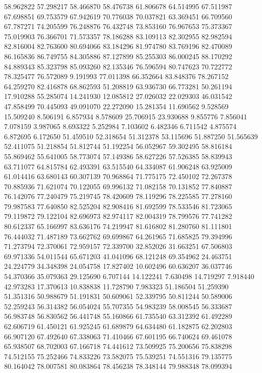 58.962822
57.298217
58.466870
58.476738
61.806678
64.514995
67.511987
67.698851
69.753579
67.942619
70.776038
70.037821
63.369451
66.709560
67.787271
74.205599
76.248876
76.432748
73.853160
76.967653
75.373367
75.019903
76.366701
71.573357
78.186288
83.109113
82.302955
82.982594
82.816004
82.763600
80.694066
83.184296
81.974780
83.769196
82.470089
86.165836
86.749755
84.305886
87.127899
85.255303
86.000245
88.170292
84.889343
85.323798
85.093260
82.135346
76.596594
80.747623
70.722772
78.325477
76.572089
9.191993
77.011398
66.352664
83.848376
78.267152
64.259270
82.416878
68.862593
51.208819
63.936730
66.773281
50.261194
17.910288
55.285074
14.241930
12.085812
27.026032
22.029303
46.031542
47.858499
70.445093
49.091070
22.272090
15.281354
11.690562
9.528569
15.509240
8.506191
6.857934
8.578609
25.706915
23.930688
9.855776
7.856041
7.078159
3.987065
8.693322
5.252984
7.103602
6.482346
6.711542
4.875574
6.872695
6.172650
51.459510
52.318654
51.312378
53.115696
51.887250
51.565639
52.411075
51.218854
51.812744
51.192254
56.052967
59.302495
58.816184
55.869462
55.641005
58.773074
57.149386
58.627226
57.526385
58.839943
63.711077
64.815784
62.493391
63.515540
64.334087
61.906248
63.925009
61.014416
63.680143
60.307139
70.968864
71.775175
72.450102
72.267378
70.885936
71.621074
70.122055
69.996132
71.082158
70.131852
77.840887
76.142076
77.240479
75.219745
78.420609
78.119296
78.225585
77.278160
79.987583
77.640850
82.525204
82.908416
81.692599
78.533546
81.723065
79.119872
79.122104
82.696973
82.974117
82.004319
78.799576
77.741282
80.612337
65.166997
83.636176
74.219947
81.616802
81.280760
81.111801
76.444032
71.487189
73.662762
69.699867
64.261965
71.685825
79.394996
71.273794
72.370061
72.959157
72.339700
32.852026
31.663251
67.506803
69.971336
54.011544
65.671203
41.041096
68.121248
69.354962
24.463751
24.224779
34.348398
24.054758
17.827402
10.602496
60.636207
36.037746
54.370366
35.079363
29.125690
6.707144
14.122241
7.630498
14.719297
7.918440
42.973283
17.370613
10.838838
11.728790
7.983323
51.186504
51.259390
51.351316
50.988679
51.191831
50.609061
52.339795
50.811244
50.589006
52.259243
56.314382
56.054024
55.707355
54.983239
58.008545
56.333687
56.983748
56.830562
56.441748
55.160866
61.735540
63.312392
61.492289
62.606719
61.450121
61.925245
61.689879
64.634480
61.182875
62.202803
66.907120
67.492640
67.338063
71.410466
67.601195
66.740624
69.461078
65.938507
68.702003
67.166718
74.441612
73.509925
75.200656
75.838298
74.512155
75.252466
74.833226
73.582075
75.539251
74.551316
79.135775
80.164042
78.007581
80.083864
78.456238
78.348144
79.988348
78.099394
